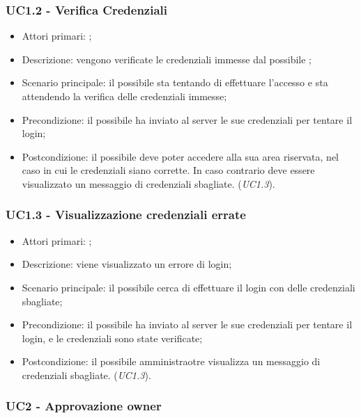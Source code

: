 \documentclass[../analisi-dei-requisiti]{subfiles}
\begin{document}
\subsubsection{UC1.2 - Verifica Credenziali}
\label{subsub:UC1.2}

\begin{itemize}
\item Attori primari: ;
\item Descrizione: vengono verificate le credenziali immesse dal possibile ;
\item Scenario principale: il possibile  sta tentando di effettuare l'accesso e sta attendendo la verifica delle credenziali immesse;
\item Precondizione: il possibile  ha inviato al server le sue credenziali per tentare il login;
\item Postcondizione: il possibile  deve poter accedere alla sua area riservata, nel caso in cui le credenziali siano corrette. In caso
contrario deve essere visualizzato un messaggio di credenziali sbagliate. (\emph{UC1.3}).

\end{itemize}

\subsubsection{UC1.3 - Visualizzazione credenziali errate}
\label{subsub:UC1.3}

\begin{itemize}
\item Attori primari: ;
\item Descrizione: viene visualizzato un errore di login;
\item Scenario principale: il possibile  cerca di effettuare il login con delle credenziali sbagliate;
\item Precondizione: il possibile  ha inviato al server le sue credenziali per tentare il login, e le credenziali sono state verificate;
\item Postcondizione: il possibile amministraotre visualizza un messaggio di credenziali sbagliate. (\emph{UC1.3}).

\end{itemize}

\subsubsection{UC2 - Approvazione owner}
\label{subsub:UC2}
\end{document}
